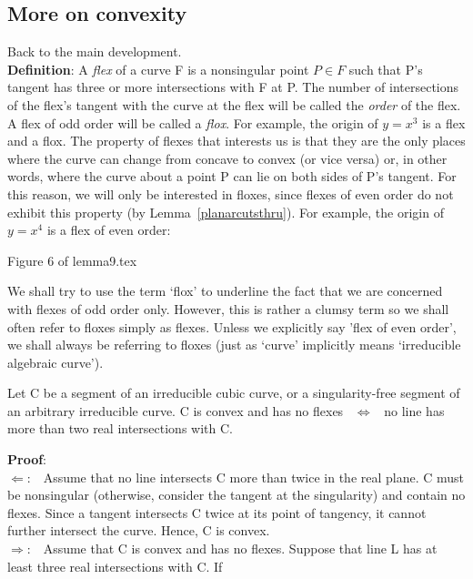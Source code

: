 \subsection{More on convexity}
Back to the main development.\vspace{.25in} \\
{\bf Definition}: A {\em flex} of a curve F is
a nonsingular point $P \in F$ such that P's tangent has
three or more intersections with F at P.  
The number of intersections of the flex's tangent with the curve at the
flex will be called the {\em order} of the flex.
A flex of odd order will be called a {\em flox}.
For example, the origin of $y=x^{3}$ is a flex and a flox.
The property of flexes that interests us is that they are the only
places where the curve can change from concave to convex (or vice versa) or,
in other words, where the curve about a point P can lie on both sides of P's
tangent.
For this reason, we will only be interested in floxes, since flexes of even
order do not exhibit this property (by Lemma~\ref{planarcutsthru}).
For example, the origin of $y=x^{4}$ is a flex of even order:
\begin{center}
Figure 6 of lemma9.tex
\end{center}
We shall try to use the term `flox' to underline the fact that we are
concerned with flexes of odd order only.
However, this is rather a clumsy term so we shall often refer to floxes
simply as flexes.
Unless we explicitly say 'flex of even order', we shall always be 
referring to floxes (just as `curve' implicitly means 
`irreducible algebraic curve').
\begin{lemma} \nopagebreak
\label{convmeans2}
Let C be a segment of an irreducible cubic curve, or a 
singularity-free segment of an arbitrary irreducible curve.
C is convex and has no flexes \ $\Leftrightarrow$ \  no line has more
than two real intersections with C.
\end{lemma}
{\bf Proof}:\nopagebreak\\
$\Leftarrow$:\ \ Assume that no line intersects C more than twice in the real
plane.  C must be nonsingular (otherwise, consider 
the tangent at the singularity)
and contain no flexes.
Since a tangent intersects C twice at its point of tangency, it cannot 
further intersect the curve.  Hence, C is convex.\vspace{.25in} \\
$\Rightarrow$:\ \ Assume that C is convex and has no flexes.
Suppose that line L has at least three real intersections with C.  If 
